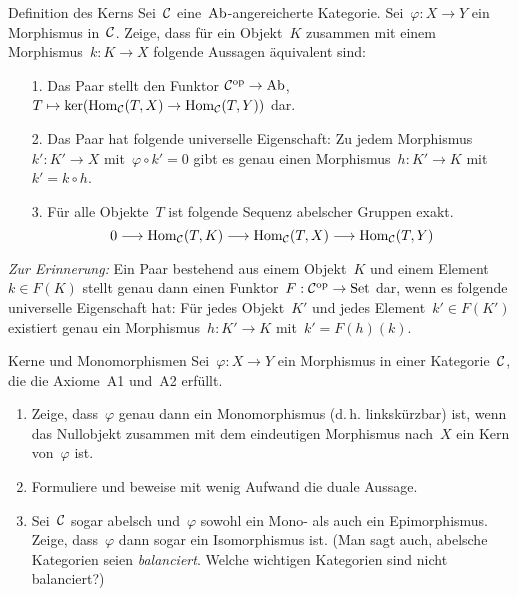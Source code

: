 \documentclass{uebblatt}
\begin{document}

\begin{aufgabe}{Definition des Kerns}
Sei~$\mathcal{C}$ eine~$\mathrm{Ab}$-angereicherte Kategorie. Sei~$\varphi : X \to Y$ ein
Morphismus in~$\mathcal{C}$. Zeige, dass für ein Objekt~$K$ zusammen mit einem Morphismus~$k
: K \to X$ folgende Aussagen äquivalent sind:
\begin{enumerate}
\item[1.] Das Paar stellt den Funktor
$\mathcal{C}^{\mathrm{op}} \to \mathrm{Ab}$, $T \mapsto
  \operatorname{ker}(\mathrm{Hom}_{\mathcal{C}}(T,X) \to \mathrm{Hom}_{\mathcal{C}}(T,Y))$ dar.
\item[2.] Das Paar hat folgende universelle Eigenschaft:
Zu jedem
Morphismus~$k' : K' \to X$ mit~$\varphi \circ k' = 0$ gibt es genau einen
Morphismus~$h : K' \to K$ mit~$k' = k \circ h$.
\item[3.] Für alle Objekte~$T$ ist folgende Sequenz abelscher Gruppen
exakt.
\[ 0 \longrightarrow \mathrm{Hom}_{\mathcal{C}}(T,K) \longrightarrow \mathrm{Hom}_{\mathcal{C}}(T,X)
  \longrightarrow \mathrm{Hom}_{\mathcal{C}}(T,Y) \]
\end{enumerate}

\emph{Zur Erinnerung:} Ein Paar bestehend aus einem Objekt~$K$ und einem
Element~$k \in F(K)$ stellt genau dann einen Funktor~$F : \mathcal{C}^{\mathrm{op}} \to \mathrm{Set}$ dar,
wenn es folgende universelle Eigenschaft hat: Für jedes Objekt~$K'$ und jedes
Element~$k' \in F(K')$ existiert genau ein Morphismus~$h : K' \to K$ mit~$k' =
F(h)(k)$.
\end{aufgabe}

\begin{aufgabe}{Kerne und Monomorphismen}
Sei~$\varphi : X \to Y$ ein Morphismus in einer Kategorie~$\mathcal{C}$, die die Axiome~A1
und~A2 erfüllt.
\begin{enumerate}
\item Zeige, dass~$\varphi$ genau dann ein Monomorphismus (d.\,h.
linkskürzbar) ist, wenn das Nullobjekt zusammen mit dem eindeutigen
Morphismus nach~$X$ ein Kern von~$\varphi$ ist.
\item Formuliere und beweise mit wenig Aufwand die duale Aussage.
\item Sei~$\mathcal{C}$ sogar abelsch und~$\varphi$ sowohl ein Mono- als auch ein
Epimorphismus. Zeige, dass~$\varphi$ dann sogar ein Isomorphismus ist.
(Man sagt auch, abelsche Kategorien seien \emph{balanciert}. Welche wichtigen
Kategorien sind nicht balanciert?)
\end{enumerate}
\end{aufgabe}
\end{document}
